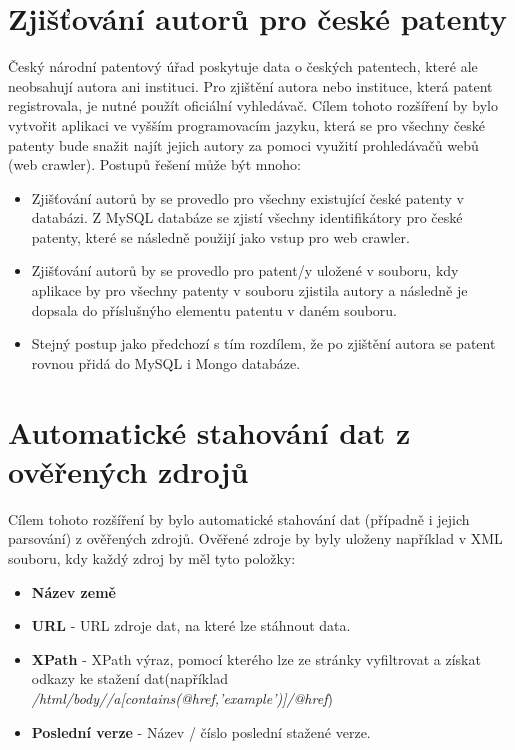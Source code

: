 \section{Zjišťování autorů pro české patenty}
Český národní patentový úřad poskytuje data o českých patentech, které ale neobsahují autora ani instituci. Pro zjištění autora nebo instituce, která patent registrovala, je nutné použít oficiální vyhledávač. Cílem tohoto rozšíření by bylo vytvořit aplikaci ve vyšším programovacím jazyku, která se pro všechny české patenty bude snažit najít jejich autory za pomoci využití prohledávačů webů (web crawler). Postupů řešení může být mnoho:
\begin{itemize}
\item Zjišťování autorů by se provedlo pro všechny existující české patenty v databázi. Z MySQL databáze se zjistí všechny identifikátory pro české patenty, které se následně použijí jako vstup pro web crawler.
\item Zjišťování autorů by se provedlo pro patent/y uložené v souboru, kdy aplikace by pro všechny patenty v souboru zjistila autory a následně je dopsala do příslušnýho elementu patentu v daném souboru.
\item Stejný postup jako předchozí s tím rozdílem, že po zjištění autora se patent rovnou přidá do MySQL i Mongo databáze.
\end{itemize}

\section{Automatické stahování dat z ověřených zdrojů}
Cílem tohoto rozšíření by bylo automatické stahování dat (případně i jejich parsování) z ověřených zdrojů. Ověřené zdroje by byly uloženy například v \gls{XML} souboru, kdy každý zdroj by měl tyto položky:
\begin{itemize}
\item \textbf{Název země}
\item \textbf{\gls{URL}} - \gls{URL} zdroje dat, na které lze stáhnout data.
\item \textbf{XPath} -  XPath výraz, pomocí kterého lze ze stránky vyfiltrovat a získat odkazy ke stažení dat\newline (například \textit{/html/body//a[contains(@href,'example')]/@href})
\item \textbf{Poslední verze} - Název / číslo poslední stažené verze. \newline
\end{itemize}

